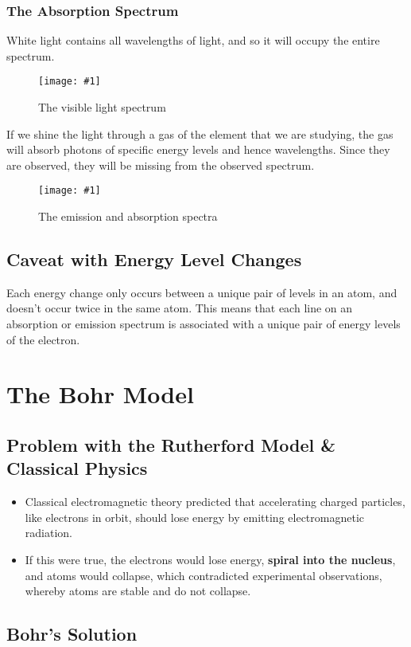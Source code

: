 \documentclass[a4paper,12pt]{article}
\let\oldsection\section
\renewcommand\section{\clearpage\oldsection}
\newcommand{\img}[4]{\begin{center}
  \begin{figure}[H]
    \centering
    \texttt{[image: \#1]}
    \caption{#3}
    \label{fig:#4}
  \end{figure}
\end{center}}
\begin{document}
\subsubsection{The Absorption Spectrum}

White light contains all wavelengths of light, and so it will occupy the entire spectrum.

\img{visiblelight.png}{0.4}{The visible light spectrum}{visiblelight}

If we shine the light through a gas of the element that we are studying, the gas will absorb photons of specific energy levels and hence wavelengths. Since they are observed, they will be missing from the observed spectrum.

\img{spectracompare.jpg}{0.5}{The emission and absorption spectra}{spectracompare}

\subsection{Caveat with Energy Level Changes}

Each energy change only occurs between a unique pair of levels in an atom, and doesn't occur twice in the same atom. This means that each line on an absorption or emission spectrum is associated with a unique pair of energy levels of the electron.




\section{The Bohr Model}

\subsection{Problem with the Rutherford Model \& Classical Physics}

\begin{itemize}
  \item Classical electromagnetic theory predicted that accelerating charged particles, like electrons in orbit, should lose energy by emitting electromagnetic radiation.
  \item If this were true, the electrons would lose energy, \textbf{spiral into the nucleus}, and atoms would collapse, which contradicted experimental observations, whereby atoms are stable and do not collapse.
\end{itemize}

\subsection{Bohr's Solution}
\end{document}
